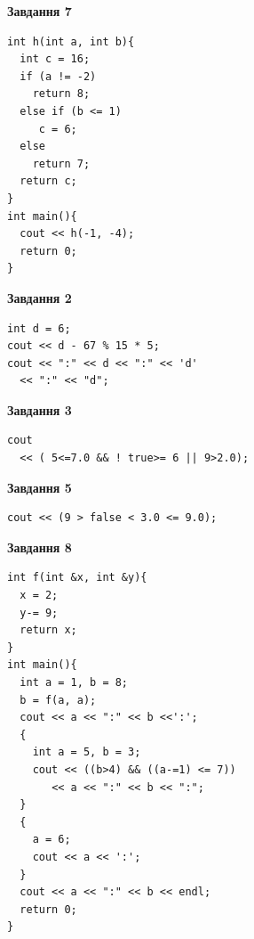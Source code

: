 \documentclass[12pt, ukrainian]{article}
\begin{document}
{\begin {large}
\begin{minipage}[t]{7.0cm}
\begin{center}
\textbf{Завдання 7}
\end{center}
\vspace{-8mm}

\begin{verbatim}
int h(int a, int b){
  int c = 16;
  if (a != -2)
    return 8;
  else if (b <= 1)
     c = 6;
  else
    return 7;
  return c;
}
int main(){
  cout << h(-1, -4);
  return 0;
}
\end{verbatim}

\end{minipage}
\vline \hspace{1mm}
\begin{minipage}[t]{11.0cm}

\begin{center}
\textbf{Завдання 2}
\end{center}
\vspace{-8mm}

\begin{verbatim}
int d = 6;
cout << d - 67 % 15 * 5;
cout << ":" << d << ":" << 'd' 
  << ":" << "d";
\end{verbatim}



\begin{center}
\textbf{Завдання 3}
\end{center}
\vspace{-8mm}

\begin{verbatim}
cout 
  << ( 5<=7.0 && ! true>= 6 || 9>2.0);
\end{verbatim}



\begin{center}
\textbf{Завдання 5}
\end{center}
\vspace{-8mm}

\begin{verbatim}
cout << (9 > false < 3.0 <= 9.0);
\end{verbatim}



\begin{center}
\textbf{Завдання 8}
\end{center}
\vspace{-8mm}

\begin{verbatim}
int f(int &x, int &y){
  x = 2;
  y-= 9;
  return x;
}
int main(){
  int a = 1, b = 8;
  b = f(a, a);
  cout << a << ":" << b <<':';
  {
    int a = 5, b = 3;
    cout << ((b>4) && ((a-=1) <= 7))
       << a << ":" << b << ":";
  }
  {
    a = 6;
    cout << a << ':';
  }
  cout << a << ":" << b << endl;
  return 0;
}
\end{verbatim}


\end{minipage}
\end{large}}
\end{document}
